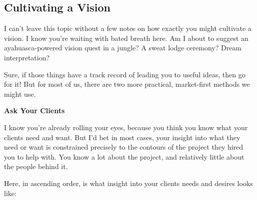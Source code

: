 \subsection{Cultivating a Vision}

I can't leave this topic without a few notes on how exactly you might cultivate a vision. I know you're waiting with bated breath here. Am I about to suggest an ayahuasca-powered vision quest in a jungle? A sweat lodge ceremony? Dream interpretation?

Sure, if those things have a track record of leading you to useful ideas, then go for it! But for most of us, there are two more practical, market-first methods we might use.

\textbf{Ask Your Clients}

I know you're already rolling your eyes, because you think you know what your clients need and want. But I'd bet in most cases, your insight into what they need or want is constrained precisely to the contours of the project they hired you to help with. You know a lot about the project, and relatively little about the people behind it.

Here, in ascending order, is what insight into your clients needs and desires looks like:

